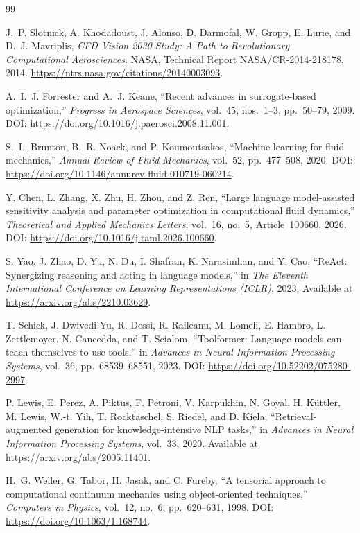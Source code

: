 \documentclass[11pt]{article}
\begin{document}
\begin{thebibliography}{99}

J.~P. Slotnick, A. Khodadoust, J. Alonso, D. Darmofal,
W. Gropp, E. Lurie, and D.~J. Mavriplis,
\textit{CFD Vision 2030 Study: A Path to Revolutionary
Computational Aerosciences}.
NASA, Technical Report NASA/CR-2014-218178, 2014.
\url{https://ntrs.nasa.gov/citations/20140003093}.

A.~I.~J. Forrester and A.~J. Keane,
``Recent advances in surrogate-based optimization,''
\textit{Progress in Aerospace Sciences}, vol.~45, nos.~1--3,
pp.~50--79, 2009.
DOI: \url{https://doi.org/10.1016/j.paerosci.2008.11.001}.

S.~L. Brunton, B.~R. Noack, and P. Koumoutsakos,
``Machine learning for fluid mechanics,''
\textit{Annual Review of Fluid Mechanics}, vol.~52,
pp.~477--508, 2020.
DOI: \url{https://doi.org/10.1146/annurev-fluid-010719-060214}.

Y. Chen, L. Zhang, X. Zhu, H. Zhou, and Z. Ren,
``Large language model-assisted sensitivity analysis and
parameter optimization in computational fluid dynamics,''
\textit{Theoretical and Applied Mechanics Letters},
vol.~16, no.~5, Article~100660, 2026.
DOI: \url{https://doi.org/10.1016/j.taml.2026.100660}.

S. Yao, J. Zhao, D. Yu, N. Du, I. Shafran,
K. Narasimhan, and Y. Cao,
``ReAct: Synergizing reasoning and acting in language models,''
in \textit{The Eleventh International Conference on
Learning Representations (ICLR)}, 2023.
Available at \url{https://arxiv.org/abs/2210.03629}.

T. Schick, J. Dwivedi-Yu, R. Dess{\`i}, R. Raileanu,
M. Lomeli, E. Hambro, L. Zettlemoyer, N. Cancedda,
and T. Scialom,
``Toolformer: Language models can teach themselves to use tools,''
in \textit{Advances in Neural Information Processing Systems},
vol.~36, pp.~68539--68551, 2023.
DOI: \url{https://doi.org/10.52202/075280-2997}.

P. Lewis, E. Perez, A. Piktus, F. Petroni, V. Karpukhin,
N. Goyal, H. K{\"u}ttler, M. Lewis, W.-t. Yih,
T. Rockt{\"a}schel, S. Riedel, and D. Kiela,
``Retrieval-augmented generation for knowledge-intensive NLP tasks,''
in \textit{Advances in Neural Information Processing Systems},
vol.~33, 2020.
Available at \url{https://arxiv.org/abs/2005.11401}.

H.~G. Weller, G. Tabor, H. Jasak, and C. Fureby,
``A tensorial approach to computational continuum mechanics
using object-oriented techniques,''
\textit{Computers in Physics}, vol.~12, no.~6,
pp.~620--631, 1998.
DOI: \url{https://doi.org/10.1063/1.168744}.


\end{thebibliography}
\end{document}
